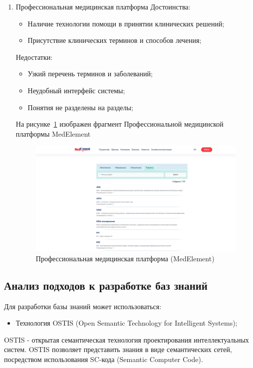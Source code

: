 \begin{enumerate}
    \item{
       Профессиональная медицинская платформа \cite{medelement}
        \newline
        Достоинства:
        \begin{itemize}
            \item{Наличие технологии помощи в принятии клинических решений;}
            \item{Присутствие клинических терминов и способов лечения;}
        \end{itemize}
        Недостатки:
        \begin{itemize}
       	\item Узкий перечень терминов и заболеваний;
        \item {Неудобный интерфейс системы;}
        \item {Понятия не разделены на разделы;}\\
        \end{itemize}
    На рисунке~\ref{fig:sections/medelement} изображен фрагмент Профессиональной медицинской платформы MedElement
   \begin{figure}[H]
   	\centering
   	\includegraphics[width=1.0\textwidth]{sections/medelement}
   	\caption{Профессиональная медицинская платформа (MedElement)}
  	\label{fig:sections/medelement}
   \end{figure}
   
    }
\end{enumerate}

\subsection{Анализ подходов к разработке баз знаний}
Для разработки базы знаний может использоваться:
\begin{itemize}
    \item Технология OSTIS (Open Semantic Technology for Intelligent Systems);
\end{itemize}
OSTIS - открытая семантическая технология проектирования интеллектуальных систем. OSTIS позволяет представить знания в виде семантических сетей, посредством использования SC-кода (Semantic Computer Code).\cite{OSTIS} 

